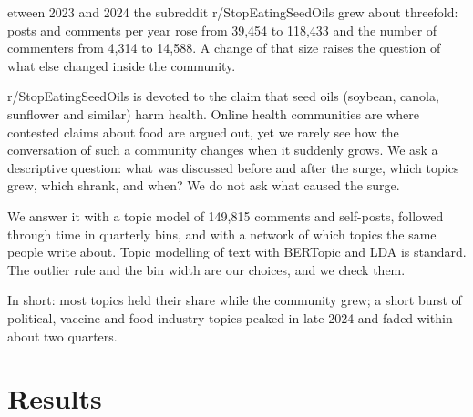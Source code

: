 
etween 2023 and 2024 the subreddit r/StopEatingSeedOils grew about threefold: posts and comments per year rose from 39{,}454 to 118{,}433 and the number of commenters from 4{,}314 to 14{,}588. A change of that size raises the question of what else changed inside the community.

r/StopEatingSeedOils is devoted to the claim that seed oils (soybean, canola, sunflower and similar) harm health. Online health communities are where contested claims about food are argued out, yet we rarely see how the conversation of such a community changes when it suddenly grows. We ask a descriptive question: what was discussed before and after the surge, which topics grew, which shrank, and when? We do not ask what caused the surge.

We answer it with a topic model of 149{,}815 comments and self-posts, followed through time in quarterly bins, and with a network of which topics the same people write about. Topic modelling of text with BERTopic \cite{grootendorst2022bertopic} and LDA \cite{blei2003lda} is standard. The outlier rule and the bin width are our choices, and we check them.

In short: most topics held their share while the community grew; a short burst of political, vaccine and food-industry topics peaked in late 2024 and faded within about two quarters.


\section*{Results}
